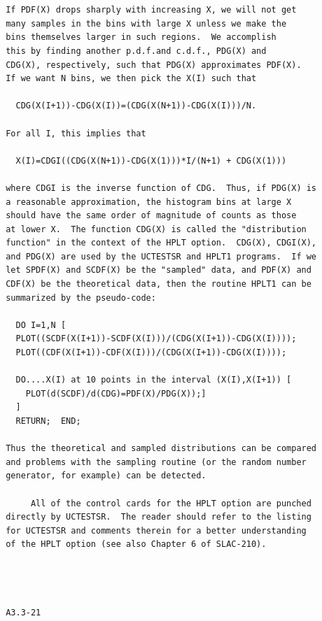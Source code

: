 \newpage {} \begin{verbatim}


 If PDF(X) drops sharply with increasing X, we will not get
 many samples in the bins with large X unless we make the
 bins themselves larger in such regions.  We accomplish
 this by finding another p.d.f.and c.d.f., PDG(X) and
 CDG(X), respectively, such that PDG(X) approximates PDF(X).
 If we want N bins, we then pick the X(I) such that

   CDG(X(I+1))-CDG(X(I))=(CDG(X(N+1))-CDG(X(I)))/N.

 For all I, this implies that

   X(I)=CDGI((CDG(X(N+1))-CDG(X(1)))*I/(N+1) + CDG(X(1)))

 where CDGI is the inverse function of CDG.  Thus, if PDG(X) is
 a reasonable approximation, the histogram bins at large X
 should have the same order of magnitude of counts as those
 at lower X.  The function CDG(X) is called the "distribution
 function" in the context of the HPLT option.  CDG(X), CDGI(X),
 and PDG(X) are used by the UCTESTSR and HPLT1 programs.  If we
 let SPDF(X) and SCDF(X) be the "sampled" data, and PDF(X) and
 CDF(X) be the theoretical data, then the routine HPLT1 can be
 summarized by the pseudo-code:

   DO I=1,N [
   PLOT((SCDF(X(I+1))-SCDF(X(I)))/(CDG(X(I+1))-CDG(X(I))));
   PLOT((CDF(X(I+1))-CDF(X(I)))/(CDG(X(I+1))-CDG(X(I))));

   DO....X(I) at 10 points in the interval (X(I),X(I+1)) [
     PLOT(d(SCDF)/d(CDG)=PDF(X)/PDG(X));]
   ]
   RETURN;  END;

 Thus the theoretical and sampled distributions can be compared
 and problems with the sampling routine (or the random number
 generator, for example) can be detected.

      All of the control cards for the HPLT option are punched
 directly by UCTESTSR.  The reader should refer to the listing
 for UCTESTSR and comments therein for a better understanding
 of the HPLT option (see also Chapter 6 of SLAC-210).




 A3.3-21
\end{verbatim}
